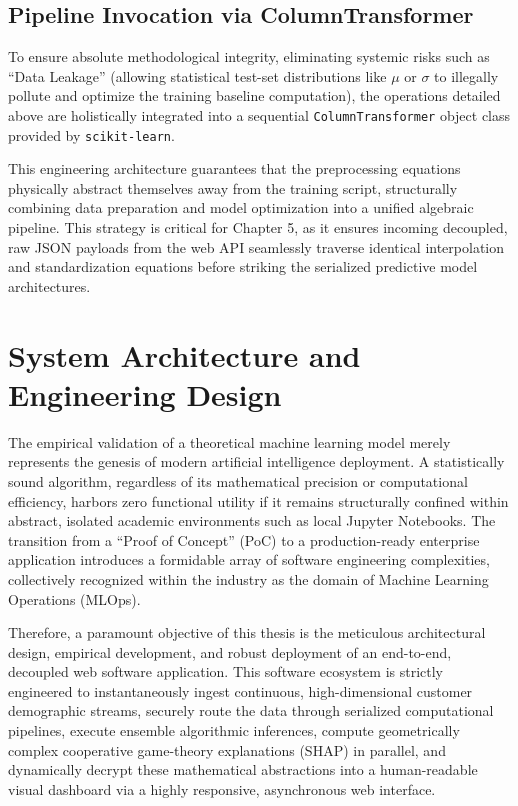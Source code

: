 \hypertarget{pipeline-invocation-via-columntransformer}{%
\subsection{Pipeline Invocation via
ColumnTransformer}\label{pipeline-invocation-via-columntransformer}}

To ensure absolute methodological integrity, eliminating systemic risks
such as ``Data Leakage'' (allowing statistical test-set distributions
like \(\mu\) or \(\sigma\) to illegally pollute and optimize the
training baseline computation), the operations detailed above are
holistically integrated into a sequential \texttt{ColumnTransformer}
object class provided by \texttt{scikit-learn}.

This engineering architecture guarantees that the preprocessing
equations physically abstract themselves away from the training script,
structurally combining data preparation and model optimization into a
unified algebraic pipeline. This strategy is critical for Chapter 5, as
it ensures incoming decoupled, raw JSON payloads from the web API
seamlessly traverse identical interpolation and standardization
equations before striking the serialized predictive model architectures.

\hypertarget{system-architecture-and-engineering-design}{%
\section{System Architecture and Engineering
Design}\label{system-architecture-and-engineering-design}}

The empirical validation of a theoretical machine learning model merely
represents the genesis of modern artificial intelligence deployment. A
statistically sound algorithm, regardless of its mathematical precision
or computational efficiency, harbors zero functional utility if it
remains structurally confined within abstract, isolated academic
environments such as local Jupyter Notebooks. The transition from a
``Proof of Concept'' (PoC) to a production-ready enterprise application
introduces a formidable array of software engineering complexities,
collectively recognized within the industry as the domain of Machine
Learning Operations (MLOps).

Therefore, a paramount objective of this thesis is the meticulous
architectural design, empirical development, and robust deployment of an
end-to-end, decoupled web software application. This software ecosystem
is strictly engineered to instantaneously ingest continuous,
high-dimensional customer demographic streams, securely route the data
through serialized computational pipelines, execute ensemble algorithmic
inferences, compute geometrically complex cooperative game-theory
explanations (SHAP) in parallel, and dynamically decrypt these
mathematical abstractions into a human-readable visual dashboard via a
highly responsive, asynchronous web interface.


